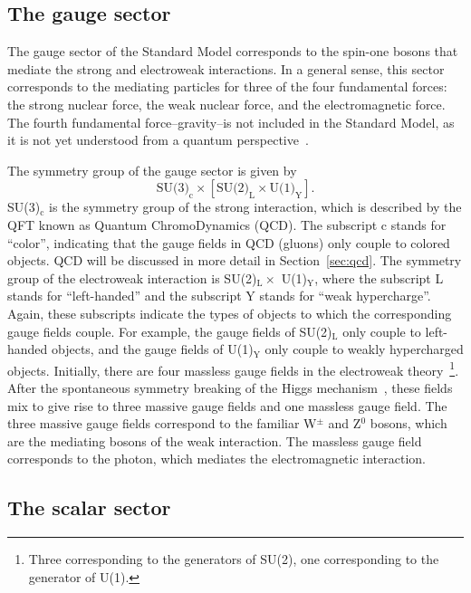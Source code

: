 \subsection{The gauge sector}
\label{sec:gauge_fields}

The gauge sector of the Standard Model corresponds to the spin-one bosons that mediate the strong and electroweak interactions. In a general sense, this sector corresponds to the mediating particles for three of the four fundamental forces: the strong nuclear force, the weak nuclear force, and the electromagnetic force. The fourth fundamental force--gravity--is not included in the Standard Model, as it is not yet understood from a quantum perspective~\cite{QuantumGravity}.

The symmetry group of the gauge sector is given by
%
\begin{equation}
    \label{eq:gauge_symmetry}
    \text{SU(3)}_\text{c} \times \left[\text{SU(2)}_\text{L} \times \text{U(1)}_\text{Y}\right].
\end{equation}
%
SU(3)$_\text{c}$ is the symmetry group of the strong interaction, which is described by the QFT known as Quantum ChromoDynamics (QCD). The subscript c stands for ``color'', indicating that the gauge fields in QCD (gluons) only couple to colored objects. QCD will be discussed in more detail in Section~\ref{sec:qcd}. The symmetry group of the electroweak interaction is SU(2)$_\text{L} \times$ U(1)$_\text{Y}$, where the subscript L stands for ``left-handed'' and the subscript Y stands for ``weak hypercharge''. Again, these subscripts indicate the types of objects to which the corresponding gauge fields couple. For example, the gauge fields of SU(2)$_\text{L}$ only couple to left-handed objects, and the gauge fields of U(1)$_\text{Y}$ only couple to weakly hypercharged objects. Initially, there are four massless gauge fields in the electroweak theory~\footnote{Three corresponding to the generators of SU(2), one corresponding to the generator of U(1).}. After the spontaneous symmetry breaking of the Higgs mechanism~\cite{HiggsPaper}, these fields mix to give rise to three massive gauge fields and one massless gauge field. The three massive gauge fields correspond to the familiar W$^{\pm}$ and Z$^{0}$ bosons, which are the mediating bosons of the weak interaction. The massless gauge field corresponds to the photon, which mediates the electromagnetic interaction.

\subsection{The scalar sector}
\label{sec:scalar_fields}

